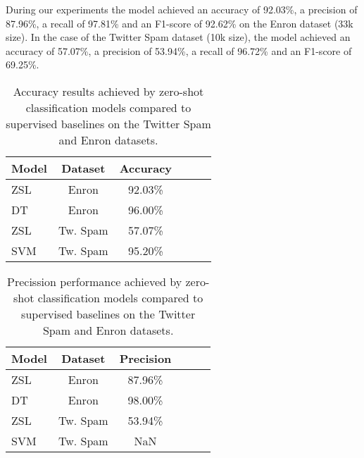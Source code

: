 \documentclass[letterpaper,twocolumn,fleqn]{article}
\begin{document}
During our experiments the model achieved an accuracy of 92.03\%, a precision of 87.96\%, a recall of 97.81\% and an F1-score of 92.62\% on the Enron dataset (33k size). In the case of the Twitter Spam dataset (10k size), the model achieved an accuracy of 57.07\%, a precision of 53.94\%, a recall of 96.72\% and an F1-score of 69.25\%.

\begin{table}[h]
  \centering
  \begin{tabular}{|l|c|c|c|c|c|}
    \hline
    Model                                     & Dataset  & Accuracy \\
    \hline
    ZSL                                       & Enron    & 92.03\%  \\
    \hline
    DT\cite{shaukatCyberThreatDetection2020}  & Enron    & 96.00\%  \\
    \hline
    ZSL                                       & Tw. Spam & 57.07\%  \\
    \hline
    SVM\cite{shaukatCyberThreatDetection2020} & Tw. Spam & 95.20\%  \\
    \hline
  \end{tabular}
  \caption{Accuracy results achieved by zero-shot classification models compared to supervised baselines on the Twitter Spam and Enron datasets.}
  \label{table:accuracy}
\end{table}
\begin{table}[h]
  \centering
  \begin{tabular}{|l|c|c|c|c|c|}
    \hline
    Model                                     & Dataset  & Precision \\
    \hline
    ZSL                                       & Enron    & 87.96\%   \\
    \hline
    DT\cite{shaukatCyberThreatDetection2020}  & Enron    & 98.00\%   \\
    \hline
    ZSL                                       & Tw. Spam & 53.94\%   \\
    \hline
    SVM\cite{shaukatCyberThreatDetection2020} & Tw. Spam & NaN       \\
    \hline
  \end{tabular}
  \caption{Precission performance achieved by zero-shot classification models compared to supervised baselines on the Twitter Spam and Enron datasets.}
  \label{table:precission}
\end{table}
\end{document}
